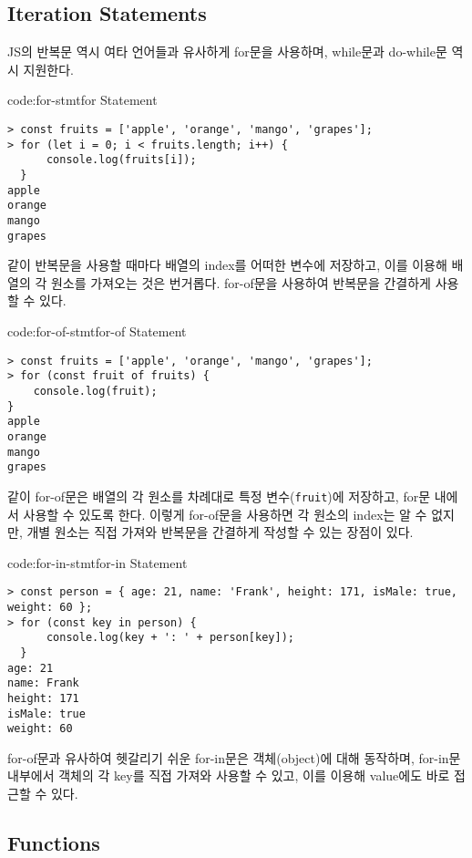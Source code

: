 \subsection*{Iteration Statements}

JS의 반복문 역시 여타 언어들과 유사하게 for문을 사용하며, while문과 do-while문 역시 지원한다.

\begin{codeenv}{code:for-stmt}{for Statement}\begin{verbatim}
> const fruits = ['apple', 'orange', 'mango', 'grapes'];
> for (let i = 0; i < fruits.length; i++) {
      console.log(fruits[i]);
  }
apple
orange
mango
grapes
\end{verbatim}
\end{codeenv}

\와 같이 반복문을 사용할 때마다 배열의 index를 어떠한 변수에 저장하고, 이를 이용해 배열의 각 원소를 가져오는 것은 번거롭다. for-of문을 사용하여 반복문을 간결하게 사용할 수 있다.

\begin{codeenv}{code:for-of-stmt}{for-of Statement}\begin{verbatim}
> const fruits = ['apple', 'orange', 'mango', 'grapes'];
> for (const fruit of fruits) {
    console.log(fruit);
}
apple
orange
mango
grapes
\end{verbatim}
\end{codeenv}

\와 같이 for-of문은 배열의 각 원소를 차례대로 특정 변수(\texttt{fruit})에 저장하고, for문 내에서 사용할 수 있도록 한다. 이렇게 for-of문을 사용하면 각 원소의 index는 알 수 없지만, 개별 원소는 직접 가져와 반복문을 간결하게 작성할 수 있는 장점이 있다.

\begin{codeenv}{code:for-in-stmt}{for-in Statement}\begin{verbatim}
> const person = { age: 21, name: 'Frank', height: 171, isMale: true, weight: 60 };
> for (const key in person) {
      console.log(key + ': ' + person[key]);
  }
age: 21
name: Frank
height: 171
isMale: true
weight: 60
\end{verbatim}
\end{codeenv}

for-of문과 유사하여 헷갈리기 쉬운 for-in문은 객체(object)에 대해 동작하며, for-in문 내부에서 객체의 각 key를 직접 가져와 사용할 수 있고, 이를 이용해 value에도 바로 접근할 수 있다.

\subsection*{Functions}

